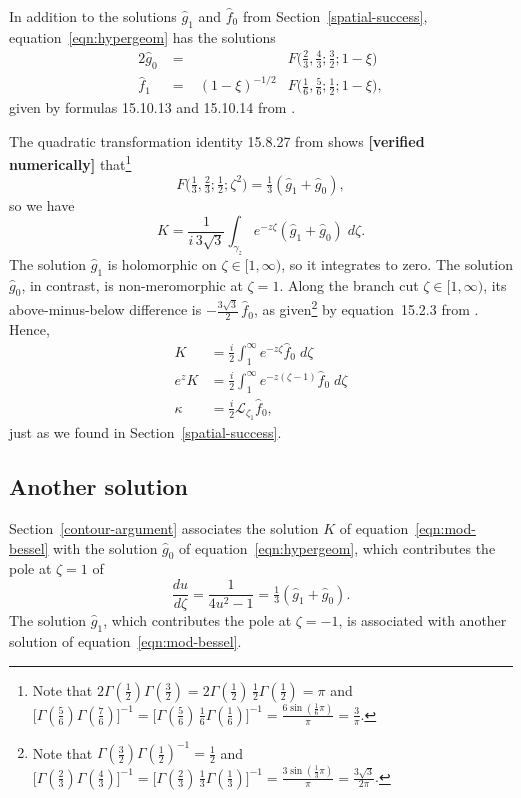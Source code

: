 \documentclass{article}
\theoremstyle{plain}
\newcommand{\laplace}{\mathcal{L}}
\begin{document}
In addition to the solutions $\hat{g}_1$ and $\hat{f}_0$ from Section~\ref{spatial-success}, equation~\ref{eqn:hypergeom} has the solutions
\begin{alignat*}{2}
\hat{g}_0 &\;=\;& & F\big(\tfrac{2}{3}, \tfrac{4}{3}; \tfrac{3}{2}; 1-\xi\big) \\
\hat{f}_1 &\;=\;& (1-\xi)^{-1/2} & F\big(\tfrac{1}{6}, \tfrac{5}{6}; \tfrac{1}{2}; 1-\xi\big),
\end{alignat*}
given by formulas 15.10.13 and 15.10.14 from \cite{dlmf}.

The quadratic transformation identity 15.8.27 from \cite{dlmf} shows \textbf{[verified numerically]} that\footnote{Note that $2\Gamma(\tfrac{1}{2})\Gamma(\tfrac{3}{2}) = 2\Gamma(\tfrac{1}{2})\,\tfrac{1}{2}\Gamma(\tfrac{1}{2}) = \pi$ and $\big[\Gamma(\tfrac{5}{6})\Gamma(\tfrac{7}{6})\big]^{-1} = \big[\Gamma(\tfrac{5}{6})\,\tfrac{1}{6}\Gamma(\tfrac{1}{6})\big]^{-1} = \frac{6\sin(\tfrac{1}{6} \pi)}{\pi} = \frac{3}{\pi}$.}
\[ F\big(\tfrac{1}{3}, \tfrac{2}{3}; \tfrac{1}{2}; \zeta^2\big) = \tfrac{1}{3}(\hat{g}_1 + \hat{g}_0), \]
so we have
\[ K = \frac{1}{i\,3\sqrt{3}} \int_{\gamma_z} e^{-z\zeta} (\hat{g}_1 + \hat{g}_0)\;d\zeta. \]
The solution $\hat{g}_1$ is holomorphic on $\zeta \in [1, \infty)$, so it integrates to zero. The solution $\hat{g}_0$, in contrast, is non-meromorphic at $\zeta = 1$. Along the branch cut $\zeta \in [1, \infty)$, its above-minus-below difference is $-\tfrac{3\sqrt{3}}{2}\,\hat{f}_0$,
as given\footnote{Note that $\Gamma(\tfrac{3}{2}) \Gamma(\tfrac{1}{2})^{-1} = \tfrac{1}{2}$ and $\big[\Gamma(\tfrac{2}{3})\Gamma(\tfrac{4}{3})\big]^{-1} = \big[\Gamma(\tfrac{2}{3})\,\tfrac{1}{3}\Gamma(\tfrac{1}{3})\big]^{-1} = \frac{3\sin(\tfrac{1}{3} \pi)}{\pi} = \frac{3\sqrt{3}}{2\pi}$.} by equation~15.2.3 from \cite{dlmf}.
Hence,
\begin{align*}
K & = \frac{i}{2} \int^\infty_1 e^{-z\zeta} \hat{f}_0\;d\zeta \\
e^z K & = \frac{i}{2} \int^\infty_1 e^{-z(\zeta - 1)} \hat{f}_0\;d\zeta \\
\kappa & = \tfrac{i}{2} \laplace_{\zeta_1} \hat{f}_0,
\end{align*}
just as we found in Section~\ref{spatial-success}.
\subsection{Another solution}
Section~\ref{contour-argument} associates the solution $K$ of equation~\ref{eqn:mod-bessel} with the solution $\hat{g}_0$ of equation~\ref{eqn:hypergeom}, which contributes the pole at $\zeta = 1$ of
\[ \frac{du}{d\zeta} = \frac{1}{4u^2 - 1} = \tfrac{1}{3}(\hat{g}_1 + \hat{g}_0). \]
The solution $\hat{g}_1$, which contributes the pole at $\zeta = -1$, is associated with another solution of equation~\ref{eqn:mod-bessel}.
\end{document}
